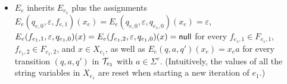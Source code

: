 \begin{itemize}
			\item $E_e$ inherits $E_{e_1}$ plus the assignments $E_e(q_{e,0},\varepsilon,f_{e,1})(x_e) = E_e(q_{e,0},\varepsilon,q_{e_1,0})(x_e) = \varepsilon$, $E_e(f_{e_1,1},\varepsilon, q_{e_1,0})(x) = E_e(f_{e_1,2},\varepsilon, q_{e_1,0})(x)= \mathsf{null}$ for every $f_{e_1,1} \in F_{e_1,1}$, $f_{e_1,2} \in F_{e_1,2}$, and $x \in X_{e_1}$, as well as $E_e(q, a, q')(x_e) = x_e a$ for every transition $(q, a, q')$ in $\mathcal{T}_{e_1}$ with $a \in \Sigma^\varepsilon$. (Intuitively, the values of all the string variables in $X_{e_1}$ are reset when starting a new iteration of $e_1$.)
		\end{itemize}

